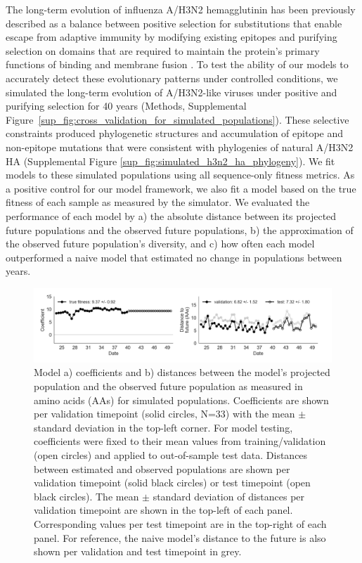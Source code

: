 The long-term evolution of influenza A/H3N2 hemagglutinin has been previously described as a balance between positive selection for substitutions that enable escape from adaptive immunity by modifying existing epitopes and purifying selection on domains that are required to maintain the protein's primary functions of binding and membrane fusion \cite{Bush:1999vj,Neher2013,Luksza:2014hj,Koelle:2015dh}.
To test the ability of our models to accurately detect these evolutionary patterns under controlled conditions, we simulated the long-term evolution of A/H3N2-like viruses under positive and purifying selection for 40 years (Methods, Supplemental Figure~\ref{sup_fig:cross_validation_for_simulated_populations}).
These selective constraints produced phylogenetic structures and accumulation of epitope and non-epitope mutations that were consistent with phylogenies of natural A/H3N2 HA (Supplemental Figure \ref{sup_fig:simulated_h3n2_ha_phylogeny}).
We fit models to these simulated populations using all sequence-only fitness metrics.
As a positive control for our model framework, we also fit a model based on the true fitness of each sample as measured by the simulator.
We evaluated the performance of each model by a) the absolute distance between its projected future populations and the observed future populations, b) the approximation of the observed future population's diversity, and c) how often each model outperformed a naive model that estimated no change in populations between years.

\begin{figure}[ht!]
  \begin{center}
  \includegraphics[width=\textwidth]{figures/unadjusted-model-accuracy-and-coefficients-for-simulated-populations-controls.png}
  \caption{
    Model a) coefficients and b) distances between the model's projected population and the observed future population as measured in amino acids (AAs) for simulated populations.
    Coefficients are shown per validation timepoint (solid circles, N=33) with the mean $\pm$ standard deviation in the top-left corner.
    For model testing, coefficients were fixed to their mean values from training/validation (open circles) and applied to out-of-sample test data.
    Distances between estimated and observed populations are shown per validation timepoint (solid black circles) or test timepoint (open black circles).
    The mean $\pm$ standard deviation of distances per validation timepoint are shown in the top-left of each panel.
    Corresponding values per test timepoint are in the top-right of each panel.
    For reference, the naive model's distance to the future is also shown per validation and test timepoint in grey.
  }
  \label{fig:unadjusted_model_accuracy_and_coefficients_for_simulated_populations_controls}
  \end{center}
\end{figure}

